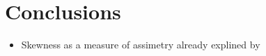 \section{Conclusions}


\begin{itemize}
	\item Skewness as a measure of assimetry already explined by \citep{Guttal2008}

	
	
\end{itemize}